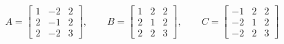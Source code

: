 \[
A = \begin{bmatrix}
 1 & -2 & 2 \\
 2 & -1 & 2 \\
 2 & -2 & 3
\end{bmatrix},\qquad
B = \begin{bmatrix}
 1 & 2 & 2 \\
 2 & 1 & 2 \\
 2 & 2 & 3
\end{bmatrix},\qquad
C = \begin{bmatrix}
-1 & 2 & 2 \\
-2 & 1 & 2 \\
-2 & 2 & 3
\end{bmatrix}
\]